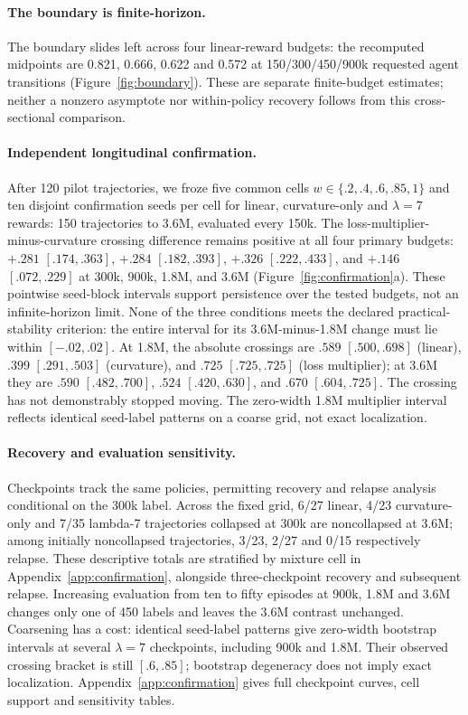 \paragraph{The boundary is finite-horizon.}
The boundary slides left across four linear-reward budgets: the recomputed
midpoints are 0.821, 0.666, 0.622 and 0.572 at 150/300/450/900k requested agent
transitions (Figure~\ref{fig:boundary}).
These are separate finite-budget estimates; neither a nonzero asymptote nor
within-policy recovery follows from this cross-sectional comparison.


\paragraph{Independent longitudinal confirmation.}
After 120 pilot trajectories, we froze five common cells $w\in\{.2,.4,.6,.85,1\}$ and ten disjoint confirmation seeds per cell for linear, curvature-only and $\lambda=7$ rewards: 150 trajectories to 3.6M, evaluated every 150k. The loss-multiplier-minus-curvature crossing difference remains positive at all four primary budgets: $+.281$ $[.174,.363]$, $+.284$ $[.182,.393]$, $+.326$ $[.222,.433]$, and $+.146$ $[.072,.229]$ at 300k, 900k, 1.8M, and 3.6M (Figure~\ref{fig:confirmation}a). These pointwise seed-block intervals support persistence over the tested budgets, not an infinite-horizon limit. None of the three conditions meets the declared practical-stability criterion: the entire interval for its 3.6M-minus-1.8M change must lie within $[-.02,.02]$.
At 1.8M, the absolute crossings are $.589$ $[.500,.698]$ (linear), $.399$ $[.291,.503]$ (curvature), and $.725$ $[.725,.725]$ (loss multiplier); at 3.6M they are $.590$ $[.482,.700]$, $.524$ $[.420,.630]$, and $.670$ $[.604,.725]$. The crossing has not demonstrably stopped moving. The zero-width 1.8M multiplier interval reflects identical seed-label patterns on a coarse grid, not exact localization.

\paragraph{Recovery and evaluation sensitivity.}
Checkpoints track the same policies, permitting recovery and relapse analysis conditional on the 300k label. Across the fixed grid, 6/27 linear, 4/23 curvature-only and 7/35 lambda-7 trajectories collapsed at 300k are noncollapsed at 3.6M; among initially noncollapsed trajectories, 3/23, 2/27 and 0/15 respectively relapse. These descriptive totals are stratified by mixture cell in Appendix~\ref{app:confirmation}, alongside three-checkpoint recovery and subsequent relapse. Increasing evaluation from ten to fifty episodes at 900k, 1.8M and 3.6M changes only one of 450 labels and leaves the 3.6M contrast unchanged. Coarsening has a cost: identical seed-label patterns give zero-width bootstrap intervals at several $\lambda=7$ checkpoints, including 900k and 1.8M. Their observed crossing bracket is still $[.6,.85]$; bootstrap degeneracy does not imply exact localization. Appendix~\ref{app:confirmation} gives full checkpoint curves, cell support and sensitivity tables.

